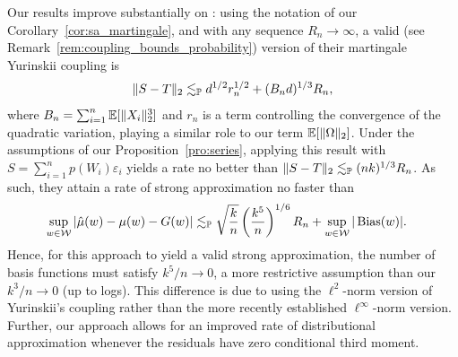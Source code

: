 Our results improve substantially on \citet[Theorem~1]{li2020uniform}: using
the notation of our Corollary~\ref{cor:sa_martingale}, and with any sequence
$R_n \to \infty$, a valid (see Remark~\ref{rem:coupling_bounds_probability})
version of their martingale Yurinskii coupling is
%
\begin{align*}
  \|S-T\|_2
  \lesssim_\P
  d^{1/2} r^{1/2}_n
  + (B_n d)^{1/3} R_n,
\end{align*}
%
where $B_n = \sum_{i=1}^n \E[\|X_i\|_2^3]$ and $r_n$ is a term controlling the
convergence of the quadratic variation, playing a similar role to our
term $\E[\|\Omega\|_2]$. Under the assumptions of our
Proposition~\ref{pro:series}, applying this
result with $S = \sum_{i=1}^n p(W_i) \varepsilon_i$ yields a rate no better
than $\|S-T\|_2 \lesssim_\P (n k)^{1/3} R_n$. As such, they attain a rate of
strong approximation no faster than
%
\begin{align*}
  \sup_{w \in \cW}
  \left| \hat\mu(w) - \mu(w) - G(w) \right|
  &\lesssim_\P
  \sqrt{\frac{k}{n}}
  \left( \frac{k^5}{n} \right)^{1/6} R_n
  + \sup_{w \in \cW} |\Bias(w)|.
\end{align*}
%
Hence, for this approach to yield a valid strong approximation, the number of
basis functions must satisfy $k^5/n \to 0$, a more restrictive assumption than
our $k^3 / n \to 0$ (up to logs). This difference is due to
\citet{li2020uniform} using the $\ell^2$-norm version of Yurinskii's coupling
rather than the more recently established $\ell^\infty$-norm version. Further,
our approach allows for an improved rate of distributional approximation
whenever the residuals have zero conditional third moment.

